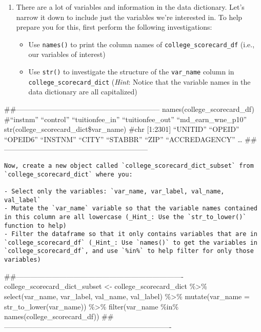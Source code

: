 \documentclass[
]{article}
\providecommand{\tightlist}{%
  \setlength{\itemsep}{0pt}\setlength{\parskip}{0pt}}
\begin{document}
\begin{enumerate}
\def\labelenumi{\arabic{enumi}.}
\item
  There are a lot of variables and information in the data dictionary.
  Let's narrow it down to include just the variables we're interested
  in. To help prepare you for this, first perform the following
  investigations:

  \begin{itemize}
  \tightlist
  \item
    Use \texttt{names()} to print the column names of
    \texttt{college\_scorecard\_df} (i.e., our variables of interest)
  \item
    Use \texttt{str()} to investigate the structure of the
    \texttt{var\_name} column in \texttt{college\_scorecard\_dict}
    (\emph{Hint}: Notice that the variable names in the data dictionary
    are all capitalized)
  \end{itemize}
\end{enumerate}

\#\#------------------------------------------------------------
names(college\_scorecard\_df) \#``instnm'' ``control''
``tuitionfee\_in'' ``tuitionfee\_out'' ``md\_earn\_wne\_p10''
str(college\_scorecard\_dict\$var\_name) \#chr {[}1:2301{]} ``UNITID''
``OPEID'' ``OPEID6'' ``INSTNM'' ``CITY'' ``STABBR'' ``ZIP''
``ACCREDAGENCY'' \ldots{}
\#\#------------------------------------------------------------

\begin{verbatim}
Now, create a new object called `college_scorecard_dict_subset` from `college_scorecard_dict` where you:

- Select only the variables: `var_name, var_label, val_name, val_label`
- Mutate the `var_name` variable so that the variable names contained in this column are all lowercase (_Hint_: Use the `str_to_lower()` function to help)
- Filter the dataframe so that it only contains variables that are in `college_scorecard_df` (_Hint_: Use `names()` to get the variables in `college_scorecard_df`, and use `%in%` to help filter for only those variables)
\end{verbatim}

\#\#----------------------------------------------------------------------
college\_scorecard\_dict\_subset \textless- college\_scorecard\_dict
\%\textgreater\% select(var\_name, var\_label, val\_name, val\_label)
\%\textgreater\% mutate(var\_name = str\_to\_lower(var\_name))
\%\textgreater\% filter(var\_name \%in\% names(college\_scorecard\_df))
\#\#----------------------------------------------------------------------
\end{document}
